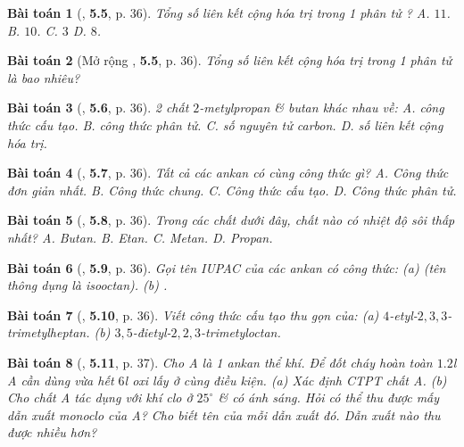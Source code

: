 \documentclass{article}
\numberwithin{equation}{section}
\newtheorem{baitoan}{Bài toán}[section]
\begin{document}
\begin{baitoan}[\cite{SBT_Hoa_Hoc_11_co_ban}, \textbf{5.5}, p. 36]
	Tổng số liên kết cộng hóa trị trong 1 phân tử \emph{}? {\sf A.} $11$. {\sf B.} $10$. {\sf C.} $3$ {\sf D.} $8$.
\end{baitoan}

\begin{baitoan}[Mở rộng \cite{SBT_Hoa_Hoc_11_co_ban}, \textbf{5.5}, p. 36]
	Tổng số liên kết cộng hóa trị trong 1 phân tử \emph{} là bao nhiêu?
\end{baitoan}

\begin{baitoan}[\cite{SBT_Hoa_Hoc_11_co_ban}, \textbf{5.6}, p. 36]
	2 chất $2$-metylpropan \& butan khác nhau về: {\sf A.} công thức cấu tạo. {\sf B.} công thức phân tử. {\sf C.} số nguyên tử carbon. {\sf D.} số liên kết cộng hóa trị.
\end{baitoan}

\begin{baitoan}[\cite{SBT_Hoa_Hoc_11_co_ban}, \textbf{5.7}, p. 36]
	Tất cả các ankan có cùng công thức gì? {\sf A.} Công thức đơn giản nhất. {\sf B.} Công thức chung. {\sf C.} Công thức cấu tạo. {\sf D.} Công thức phân tử.
\end{baitoan}

\begin{baitoan}[\cite{SBT_Hoa_Hoc_11_co_ban}, \textbf{5.8}, p. 36]
	Trong các chất dưới đây, chất nào có nhiệt độ sôi thấp nhất? {\sf A.} Butan. {\sf B.} Etan. {\sf C.} Metan. {\sf D.} Propan.
\end{baitoan}

\begin{baitoan}[\cite{SBT_Hoa_Hoc_11_co_ban}, \textbf{5.9}, p. 36]
	Gọi tên IUPAC của các ankan có công thức: (a) \emph{} (tên thông dụng là \emph{isooctan}). (b) \emph{}.
\end{baitoan}

\begin{baitoan}[\cite{SBT_Hoa_Hoc_11_co_ban}, \textbf{5.10}, p. 36]
	Viết công thức cấu tạo thu gọn của: (a) $4$-etyl-$2,3,3$-trimetylheptan. (b) $3,5$-đietyl-$2,2,3$-trimetyloctan.
\end{baitoan}

\begin{baitoan}[\cite{SBT_Hoa_Hoc_11_co_ban}, \textbf{5.11}, p. 37]
	Cho A là 1 ankan thể khí. Để đốt cháy hoàn toàn $1.2$\emph{l} A cần dùng vừa hết $6$\emph{l} oxi lấy ở cùng điều kiện. (a) Xác định CTPT chất A. (b) Cho chất A tác dụng với khí clo ở $25^\circ$ \& có ánh sáng. Hỏi có thể thu được mấy dẫn xuất monoclo của A? Cho biết tên của mỗi dẫn xuất đó. Dẫn xuất nào thu được nhiều hơn?
\end{baitoan}
\end{document}
